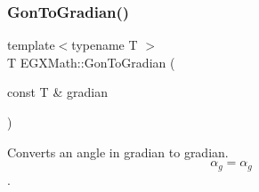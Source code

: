 \mbox{\label{group___e_g_x_math-_angle_conversions-_gon_ga69eb507d44c7a0bfc5660ed3ebcc2f1a}} 
\subsubsection{\texorpdfstring{Gon\+To\+Gradian()}{GonToGradian()}}
{\footnotesize\ttfamily template$<$typename T $>$ \\
T E\+G\+X\+Math\+::\+Gon\+To\+Gradian (\begin{DoxyParamCaption}\item[{const T \&}]{gradian }\end{DoxyParamCaption})}



Converts an angle in gradian to gradian. \[\alpha_{g}=\alpha_{g}\]. 

